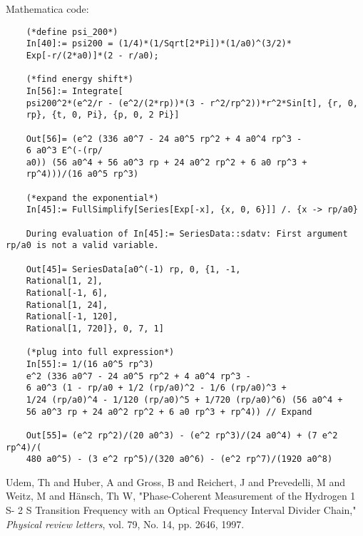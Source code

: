 \documentclass{article}
\theoremstyle{definition}
\begin{document}
\begin{enumerate}[label=(\alph*)]
	
	Mathematica code:
	\begin{lstlisting}
	(*define psi_200*)
	In[40]:= psi200 = (1/4)*(1/Sqrt[2*Pi])*(1/a0)^(3/2)*
	Exp[-r/(2*a0)]*(2 - r/a0);
	
	(*find energy shift*)
	In[56]:= Integrate[
	psi200^2*(e^2/r - (e^2/(2*rp))*(3 - r^2/rp^2))*r^2*Sin[t], {r, 0, 
	rp}, {t, 0, Pi}, {p, 0, 2 Pi}]
	
	Out[56]= (e^2 (336 a0^7 - 24 a0^5 rp^2 + 4 a0^4 rp^3 - 
	6 a0^3 E^(-(rp/
	a0)) (56 a0^4 + 56 a0^3 rp + 24 a0^2 rp^2 + 6 a0 rp^3 + 
	rp^4)))/(16 a0^5 rp^3)
	
	(*expand the exponential*)
	In[45]:= FullSimplify[Series[Exp[-x], {x, 0, 6}]] /. {x -> rp/a0}
	
	During evaluation of In[45]:= SeriesData::sdatv: First argument rp/a0 is not a valid variable.
	
	Out[45]= SeriesData[a0^(-1) rp, 0, {1, -1, 
	Rational[1, 2], 
	Rational[-1, 6], 
	Rational[1, 24], 
	Rational[-1, 120], 
	Rational[1, 720]}, 0, 7, 1]
	
	(*plug into full expression*)
	In[55]:= 1/(16 a0^5 rp^3)
	e^2 (336 a0^7 - 24 a0^5 rp^2 + 4 a0^4 rp^3 - 
	6 a0^3 (1 - rp/a0 + 1/2 (rp/a0)^2 - 1/6 (rp/a0)^3 + 
	1/24 (rp/a0)^4 - 1/120 (rp/a0)^5 + 1/720 (rp/a0)^6) (56 a0^4 + 
	56 a0^3 rp + 24 a0^2 rp^2 + 6 a0 rp^3 + rp^4)) // Expand
	
	Out[55]= (e^2 rp^2)/(20 a0^3) - (e^2 rp^3)/(24 a0^4) + (7 e^2 rp^4)/(
	480 a0^5) - (3 e^2 rp^5)/(320 a0^6) - (e^2 rp^7)/(1920 a0^8)
	\end{lstlisting}
\end{enumerate}


\begin{thebibliography}{100}
	 Udem, Th and Huber, A and Gross, B and Reichert, J and Prevedelli, M and Weitz, M and H{\"a}nsch, Th W, "Phase-Coherent Measurement of the Hydrogen 1 S- 2 S Transition Frequency with an Optical Frequency Interval Divider Chain," \emph{Physical review letters}, vol. 79, No. 14, pp. 2646, 1997.
	
	
\end{thebibliography}
\end{document}
